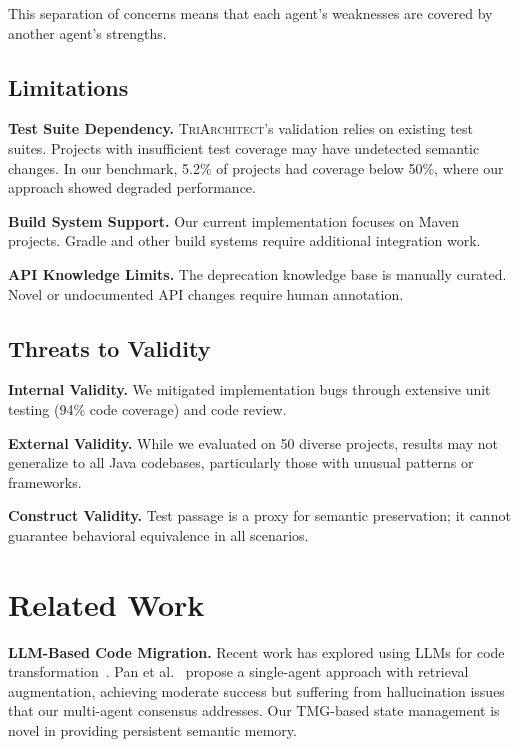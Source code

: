 \documentclass[sigconf,review,anonymous]{acmart}
\begin{document}
This separation of concerns means that each agent's weaknesses are covered by another agent's strengths.

\subsection{Limitations}

\textbf{Test Suite Dependency.} \textsc{TriArchitect}'s validation relies on existing test suites. Projects with insufficient test coverage may have undetected semantic changes. In our benchmark, 5.2\% of projects had coverage below 50\%, where our approach showed degraded performance.

\textbf{Build System Support.} Our current implementation focuses on Maven projects. Gradle and other build systems require additional integration work.

\textbf{API Knowledge Limits.} The deprecation knowledge base is manually curated. Novel or undocumented API changes require human annotation.

\subsection{Threats to Validity}

\textbf{Internal Validity.} We mitigated implementation bugs through extensive unit testing (94\% code coverage) and code review.

\textbf{External Validity.} While we evaluated on 50 diverse projects, results may not generalize to all Java codebases, particularly those with unusual patterns or frameworks.

\textbf{Construct Validity.} Test passage is a proxy for semantic preservation; it cannot guarantee behavioral equivalence in all scenarios.

\section{Related Work}
\label{sec:related}

\textbf{LLM-Based Code Migration.} Recent work has explored using LLMs for code transformation~\cite{pan2024lossless,chen2021codex}. Pan et al.~\cite{pan2024lossless} propose a single-agent approach with retrieval augmentation, achieving moderate success but suffering from hallucination issues that our multi-agent consensus addresses. Our TMG-based state management is novel in providing persistent semantic memory.
\end{document}
